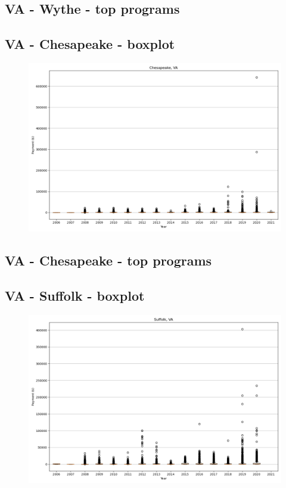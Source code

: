 \subsection*{VA - Wythe - top programs}

\newpage
\subsection*{VA - Chesapeake - boxplot}
\begin{figure}[h]
\centering
\includegraphics[width=7in]{../output/boxplots/counties/Chesapeake-VA_boxplot.png}
\end{figure}


\subsection*{VA - Chesapeake - top programs}

\newpage
\subsection*{VA - Suffolk - boxplot}
\begin{figure}[h]
\centering
\includegraphics[width=7in]{../output/boxplots/counties/Suffolk-VA_boxplot.png}
\end{figure}


